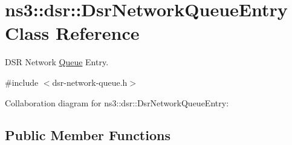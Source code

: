 \hypertarget{classns3_1_1dsr_1_1DsrNetworkQueueEntry}{}\section{ns3\+:\+:dsr\+:\+:Dsr\+Network\+Queue\+Entry Class Reference}
\label{classns3_1_1dsr_1_1DsrNetworkQueueEntry}


D\+SR Network \hyperlink{classns3_1_1Queue}{Queue} Entry.  




{\ttfamily \#include $<$dsr-\/network-\/queue.\+h$>$}



Collaboration diagram for ns3\+:\+:dsr\+:\+:Dsr\+Network\+Queue\+Entry\+:
\subsection*{Public Member Functions}
